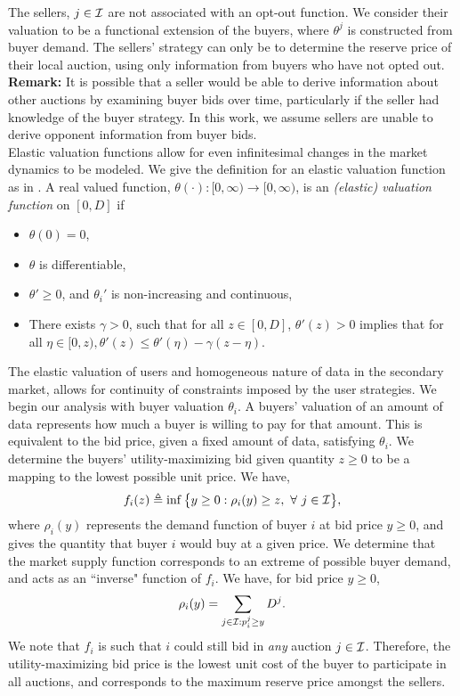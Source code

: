 The sellers, $j\in\mathcal{I}$ are not associated with an opt-out function. We
consider their valuation to be a functional extension of the buyers, where
$\theta^j$ is constructed from buyer demand.
The sellers' strategy can only be to determine the reserve price of their local
auction, using only information from buyers who have not opted out.
\\
\textbf{Remark:}
It is possible that a seller would be able to derive information about other
auctions by examining buyer bids over time, particularly if the seller had
knowledge of the buyer strategy. In this work, we assume sellers are unable to
derive opponent information from buyer bids. \\

Elastic valuation functions allow for even infinitesimal changes in the market
dynamics to be modeled. We give the definition for an elastic valuation
function as in \cite{lazar}.
A real valued function, $\theta(\cdot): [0,\infty) \rightarrow [0,\infty)$, is an \emph{(elastic) valuation
function} on $[0, D]$ if 
\begin{itemize}
    \item $\theta(0) = 0$,
    \item $\theta$ is differentiable,
    \item ${\theta}' \ge 0$, and ${\theta_i}'$ is non-increasing and continuous,
     \item There exists $\gamma > 0$, such that for all $z \in [0,D]$,
${\theta}'(z) > 0$ implies that for all $\eta \in [0, z), {\theta}'(z) \le
{\theta}'(\eta)
- \gamma(z - \eta)$. 
\end{itemize}

The elastic valuation of users and homogeneous nature of data in the secondary market, 
allows for continuity of constraints imposed by the user strategies. 
We begin our analysis with buyer valuation $\theta_i$.
A buyers' valuation of an amount of data represents how much a buyer is willing
to pay for that amount. 
This is equivalent to the bid price, given a fixed amount of data,
satisfying $\theta_i$. We determine the
buyers' utility-maximizing bid given quantity $z\ge0$ to be a mapping to the lowest
possible unit price. We have,
\begin{equation}\label{buyerinversedemand}
    f_i(z) \triangleq \inf\big\lbrace y\ge 0:
        \rho_i(y) \ge z, \ \forall \ j \in \mathcal{I}\big\rbrace,
\end{equation}
where $\rho_i(y)$ represents the demand function of buyer $i$ at bid price
$y\ge 0$, and gives the quantity that buyer $i$ would buy at a given price.
We determine that the market supply function corresponds to an extreme of
possible buyer demand, and 
acts as an ``inverse" function of $f_i$. We have, for bid price $y\ge 0$,
\begin{equation}\label{datasupply}
    \rho_i(y) = \sum_{j\in\mathcal{I} : p_i^j\ge y} D^j.
\end{equation}
We note that $f_i$ is such that
$i$ could still bid in \emph{any} auction $j\in\mathcal{I}$.
Therefore, the utility-maximizing bid price is the
lowest unit cost of the buyer to participate in all auctions, and corresponds to
the maximum reserve price amongst the sellers. 

